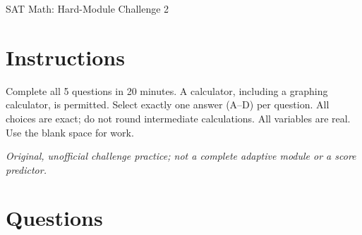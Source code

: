 \documentclass[12pt]{article}
\begin{document}
\begin{center}
  {\Large SAT Math: Hard-Module Challenge 2}
\end{center}

\section*{Instructions}
Complete all 5 questions in 20 minutes. A calculator, including a graphing calculator, is permitted. Select exactly one answer (A--D) per question. All choices are exact; do not round intermediate calculations. All variables are real. Use the blank space for work.

\noindent\textit{Original, unofficial challenge practice; not a complete adaptive module or a score predictor.}

\section*{Questions}
\end{document}
